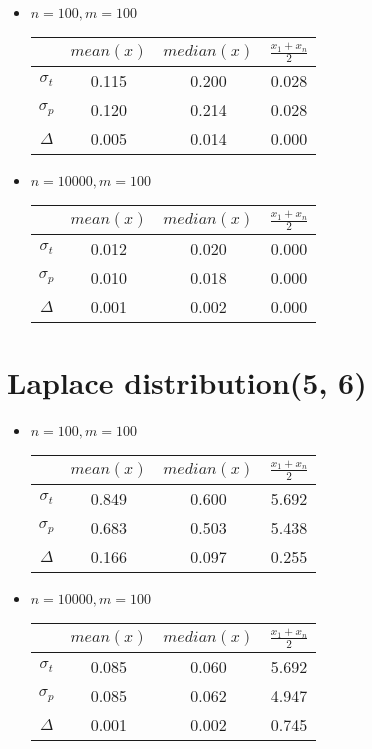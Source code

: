\documentclass[12pt, a4paper]{article}
\begin{document}
\begin{itemize}
    \item $n = 100, m = 100$

    \begin{tabular}{|c|c|c|c|}
        \hline & $mean(x)$ & $median(x)$ & $\frac{x_1 + x_n}{2}$ \\
        \hline $\sigma_t$ & 0.115 & 0.200 & 0.028 \\
        \hline $\sigma_p$ & 0.120 & 0.214 & 0.028 \\
        \hline $\Delta$ & 0.005 & 0.014 & 0.000 \\
        \hline
    \end{tabular}
    
    \item $n = 10000, m = 100$
    
    \begin{tabular}{|c|c|c|c|}
        \hline & $mean(x)$ & $median(x)$ & $\frac{x_1 + x_n}{2}$ \\
        \hline $\sigma_t$ & 0.012 & 0.020 & 0.000 \\
        \hline $\sigma_p$ & 0.010 & 0.018 & 0.000 \\
        \hline $\Delta$ & 0.001 & 0.002 & 0.000 \\
        \hline
    \end{tabular}
    
\end{itemize}

\newpage
\section{Laplace distribution(5, 6)}

\begin{itemize}
    \item $n = 100, m = 100$

    \begin{tabular}{|c|c|c|c|}
        \hline & $mean(x)$ & $median(x)$ & $\frac{x_1 + x_n}{2}$ \\
        \hline $\sigma_t$ & 0.849 & 0.600 & 5.692 \\
        \hline $\sigma_p$ & 0.683 & 0.503 & 5.438 \\
        \hline $\Delta$ & 0.166 & 0.097 & 0.255 \\
        \hline
    \end{tabular}
    
    \item $n = 10000, m = 100$
    
    \begin{tabular}{|c|c|c|c|}
        \hline & $mean(x)$ & $median(x)$ & $\frac{x_1 + x_n}{2}$ \\
        \hline $\sigma_t$ & 0.085 & 0.060 & 5.692 \\
        \hline $\sigma_p$ & 0.085 & 0.062 & 4.947 \\
        \hline $\Delta$ & 0.001 & 0.002 & 0.745 \\
        \hline
    \end{tabular}
    
\end{itemize}
\end{document}
